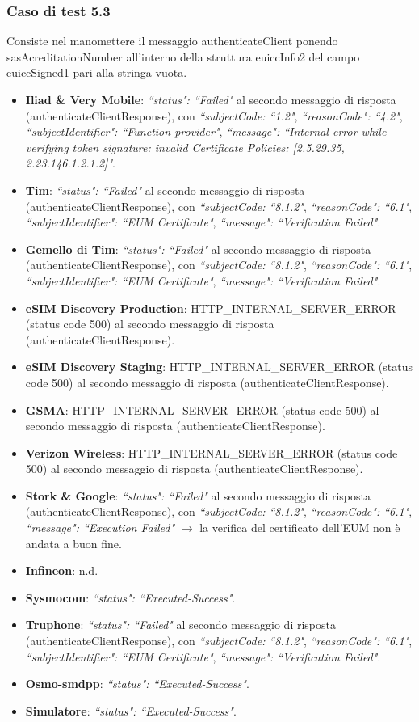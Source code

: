 \documentclass[10pt, oneside]{book}
\begin{document}
\subsubsection{Caso di test 5.3}
Consiste nel manomettere il messaggio authenticateClient ponendo sasAcreditationNumber all'interno della struttura euiccInfo2 del campo euiccSigned1 pari alla stringa vuota.
\begin{itemize}
\item \textbf{Iliad \& Very Mobile}: \textit{``status": ``Failed"} al secondo messaggio di risposta (authenticateClientResponse), con \textit{``subjectCode: ``1.2"}, \textit{``reasonCode": ``4.2"}, \textit{``subjectIdentifier": ``Function provider"}, \textit{``message": ``Internal error while verifying token signature: invalid Certificate Policies: [2.5.29.35, 2.23.146.1.2.1.2]"}.
\item \textbf{Tim}: \textit{``status": ``Failed"} al secondo messaggio di risposta (authenticateClientResponse), con \textit{``subjectCode: ``8.1.2"}, \textit{``reasonCode": ``6.1"}, \textit{``subjectIdentifier": ``EUM Certificate"}, \textit{``message": ``Verification Failed"}.
\item \textbf{Gemello di Tim}: \textit{``status": ``Failed"} al secondo messaggio di risposta (authenticateClientResponse), con \textit{``subjectCode: ``8.1.2"}, \textit{``reasonCode": ``6.1"}, \textit{``subjectIdentifier": ``EUM Certificate"}, \textit{``message": ``Verification Failed"}.
\item \textbf{eSIM Discovery Production}: HTTP\_INTERNAL\_SERVER\_ERROR (status code 500) al secondo messaggio di risposta (authenticateClientResponse).
\item \textbf{eSIM Discovery Staging}: HTTP\_INTERNAL\_SERVER\_ERROR (status code 500) al secondo messaggio di risposta (authenticateClientResponse).
\item \textbf{GSMA}: HTTP\_INTERNAL\_SERVER\_ERROR (status code 500) al secondo messaggio di risposta (authenticateClientResponse).
\item \textbf{Verizon Wireless}: HTTP\_INTERNAL\_SERVER\_ERROR (status code 500) al secondo messaggio di risposta (authenticateClientResponse).
\item \textbf{Stork \& Google}: \textit{``status": ``Failed"} al secondo messaggio di risposta (authenticateClientResponse), con \textit{``subjectCode: ``8.1.2"}, \textit{``reasonCode": ``6.1"}, \textit{``message": ``Execution Failed"} $\rightarrow$ la verifica del certificato dell'EUM non è andata a buon fine.
\item \textbf{Infineon}: n.d.
\item \textbf{Sysmocom}: \textit{``status": ``Executed-Success"}.
\item \textbf{Truphone}: \textit{``status": ``Failed"} al secondo messaggio di risposta (authenticateClientResponse), con \textit{``subjectCode: ``8.1.2"}, \textit{``reasonCode": ``6.1"}, \textit{``subjectIdentifier": ``EUM Certificate"}, \textit{``message": ``Verification Failed"}.
\item \textbf{Osmo-smdpp}: \textit{``status": ``Executed-Success"}.
\item \textbf{Simulatore}: \textit{``status": ``Executed-Success"}.
\end{itemize}
\end{document}
